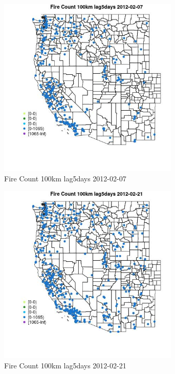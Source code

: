 \begin{figure} 
\centering  
\includegraphics[width=0.77\textwidth]{Code_Outputs/Report_ML_input_PM25_Step4_part_f_de_duplicated_aveswNAs_MapObsFire_Count_100km_lag5days2012-02-07.jpg} 
\caption{\label{fig:Report_ML_input_PM25_Step4_part_f_de_duplicated_aveswNAsMapObsFire_Count_100km_lag5days2012-02-07}Fire Count 100km lag5days 2012-02-07} 
\end{figure} 
 

\clearpage 

\begin{figure} 
\centering  
\includegraphics[width=0.77\textwidth]{Code_Outputs/Report_ML_input_PM25_Step4_part_f_de_duplicated_aveswNAs_MapObsFire_Count_100km_lag5days2012-02-21.jpg} 
\caption{\label{fig:Report_ML_input_PM25_Step4_part_f_de_duplicated_aveswNAsMapObsFire_Count_100km_lag5days2012-02-21}Fire Count 100km lag5days 2012-02-21} 
\end{figure} 
 

